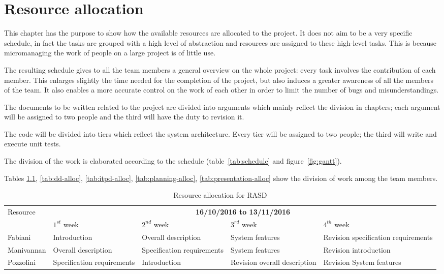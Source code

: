\chapter{Resource allocation}

This chapter has the purpose to show how the available resources are allocated to the project. It does not aim to be a very specific schedule, in fact the tasks are grouped with a high level of abstraction and resources are assigned to these high-level tasks. This is because micromanaging the work of people on a large project is of little use.

The resulting schedule gives to all the team members a general overview on the whole project: every task involves the contribution of each member.
This enlarges slightly the time needed for the completion of the project, but also induces a greater awareness of all the members of the team.
It also enables a more accurate control on the work of each other in order to limit the number of bugs and misunderstandings.

The documents to be written related to the project are divided into arguments which mainly reflect the division in chapters; each argument will be assigned to two people and the third will have the duty to revision it.

The code will be divided into tiers which reflect the system architecture. Every tier will be assigned to two people; the third will write and execute unit tests.

The division of the work is elaborated according to the schedule (table~\ref{tab:schedule} and figure~\ref{fig:gantt}).

Tables \ref{tab:rasd-alloc}, \ref{tab:dd-alloc}, \ref{tab:itpd-alloc}, \ref{tab:planning-alloc}, \ref{tab:presentation-alloc} show the division of work among the team members.

\begin{table}[H]
	\begin{tabular}{|l|p{2.35cm}|p{2.35cm}|p{2.35cm}|p{2.35cm}|}
		\hline
			\multirow{2}{*}{Resource} & \multicolumn{4}{c|}{\textbf{16/10/2016 to 13/11/2016}} \\
			\cline{2-5}
			& $1^{st}$ week & $2^{nd}$ week & $3^{rd} $ week & $4^{th}$ week \\
			\hline
			Fabiani & Introduction & Overall description & System features & Revision specification requirements \\
			Manivannan & Overall description & Specification requirements & System features & Revision introduction \\
			Pozzolini & Specification requirements & Introduction & Revision overall description  & Revision System features  \\
			\hline
		\end{tabular}
	\caption{Resource allocation for RASD}
	\label{tab:rasd-alloc}
\end{table}

